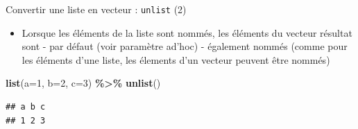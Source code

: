 \documentclass[
  ignorenonframetext,
]{beamer}
\newenvironment{Shaded}{\begin{snugshade}}{\end{snugshade}}
\newcommand{\AttributeTok}[1]{\textcolor[rgb]{0.13,0.29,0.53}{#1}}
\newcommand{\DecValTok}[1]{\textcolor[rgb]{0.00,0.00,0.81}{#1}}
\newcommand{\FunctionTok}[1]{\textcolor[rgb]{0.13,0.29,0.53}{\textbf{#1}}}
\newcommand{\NormalTok}[1]{#1}
\newcommand{\SpecialCharTok}[1]{\textcolor[rgb]{0.81,0.36,0.00}{\textbf{#1}}}
\providecommand{\tightlist}{%
  \setlength{\itemsep}{0pt}\setlength{\parskip}{0pt}}
\begin{document}
\begin{frame}[fragile]{Convertir une liste en vecteur : \texttt{unlist}
(2)}
\protect\hypertarget{convertir-une-liste-en-vecteur-unlist-2}{}
\begin{itemize}
\tightlist
\item
  Lorsque les éléments de la liste sont nommés, les éléments du vecteur
  résultat sont - par défaut (voir paramètre ad'hoc) - également nommés
  (comme pour les éléments d'une liste, les élements d'un vecteur
  peuvent être nommés)
\end{itemize}

\tiny

\begin{Shaded}
\begin{Highlighting}[]
\FunctionTok{list}\NormalTok{(}\AttributeTok{a=}\DecValTok{1}\NormalTok{, }\AttributeTok{b=}\DecValTok{2}\NormalTok{, }\AttributeTok{c=}\DecValTok{3}\NormalTok{) }\SpecialCharTok{\%\textgreater{}\%} \FunctionTok{unlist}\NormalTok{()}
\end{Highlighting}
\end{Shaded}

\begin{verbatim}
## a b c 
## 1 2 3
\end{verbatim}

\normalsize
\end{frame}
\end{document}
